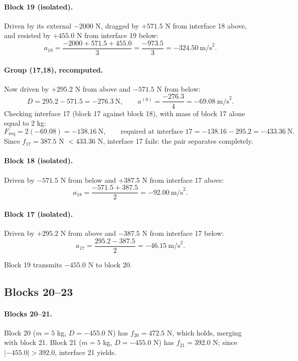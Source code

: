 \documentclass[11pt,a4paper]{article}
\begin{document}
\paragraph{Block 19 (isolated).} Driven by its external $-2000$ N, dragged by $+571.5$ N from interface 18 above, and resisted by $+455.0$ N from interface 19 below:
\[
a_{19} = \frac{-2000+571.5+455.0}{3} = \frac{-973.5}{3} = -324.50\ \text{m/s}^2 .
\]

\paragraph{Group (17,18), recomputed.} Now driven by $+295.2$ N from above and $-571.5$ N from below:
\[
D = 295.2-571.5 = -276.3\ \text{N}, \qquad a^{(0)} = \frac{-276.3}{4} = -69.08\ \text{m/s}^2 .
\]
Checking interface 17 (block 17 against block 18), with mass of block 17 alone equal to 2 kg:
\[
F_{\mathrm{req}} = 2(-69.08) = -138.16\ \text{N}, \qquad \text{required at interface 17} = -138.16-295.2 = -433.36\ \text{N}.
\]
Since $f_{17}=387.5$ N $< 433.36$ N, interface 17 fails: the pair separates completely.

\paragraph{Block 18 (isolated).} Driven by $-571.5$ N from below and $+387.5$ N from interface 17 above:
\[
a_{18} = \frac{-571.5+387.5}{2} = -92.00\ \text{m/s}^2 .
\]

\paragraph{Block 17 (isolated).} Driven by $+295.2$ N from above and $-387.5$ N from interface 17 below:
\[
a_{17} = \frac{295.2-387.5}{2} = -46.15\ \text{m/s}^2 .
\]

Block 19 transmits $-455.0$ N to block 20.

\subsection{Blocks 20--23}

\paragraph{Blocks 20--21.} Block 20 ($m=5$ kg, $D=-455.0$ N) has $f_{20}=472.5$ N, which holds, merging with block 21. Block 21 ($m=5$ kg, $D=-455.0$ N) has $f_{21}=392.0$ N; since $|{-455.0}|>392.0$, interface 21 yields.
\end{document}
